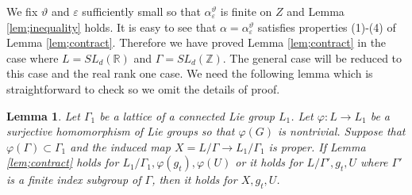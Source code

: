 \documentclass[12pt]{amsart}
\newtheorem{lem}[thm]{Lemma}
\theoremstyle{definition}
\theoremstyle{remark}
\numberwithin{equation}{section}
\begin{document}
We fix $\vartheta $ and $\varepsilon$ sufficiently small so that 
$\alpha_\varepsilon^\vartheta$
is finite on $Z$ and  Lemma \ref{lem;inequality} holds. 
It is easy to see  that $\alpha=\alpha_\varepsilon^\vartheta $ satisfies properties (1)-(4) of Lemma \ref{lem;contract}. 
Therefore   we have proved Lemma \ref{lem;contract} in the case where
$L=SL_d(\mathbb R)$ and $\Gamma=SL_d(\mathbb Z)$. The general case will 
be reduced to this case 
and the real rank one case. 
We need the following 
lemma which is straightforward to check  so we omit the details of proof. 

\begin{lem}\label{lem;straight}
Let $\Gamma_1$ be a lattice of a connected Lie group $L_1$. Let $\varphi: L\to L_1$ be a surjective
homomorphism of Lie groups so that $\varphi(G)$ is nontrivial. Suppose that $\varphi(\Gamma)\subset 
\Gamma_1$ and the induced map $X=L/\Gamma\to L_1/\Gamma_1$ is proper. If Lemma \ref{lem;contract}
holds for  $L_1/\Gamma_1, \varphi(g_t), \varphi(U)$ or it holds for 
$L/\Gamma', g_t, U$ where $\Gamma'$ is a finite index subgroup of $\Gamma$, then it holds for $X, g_t, U$. 
\end{lem}
\end{document}
